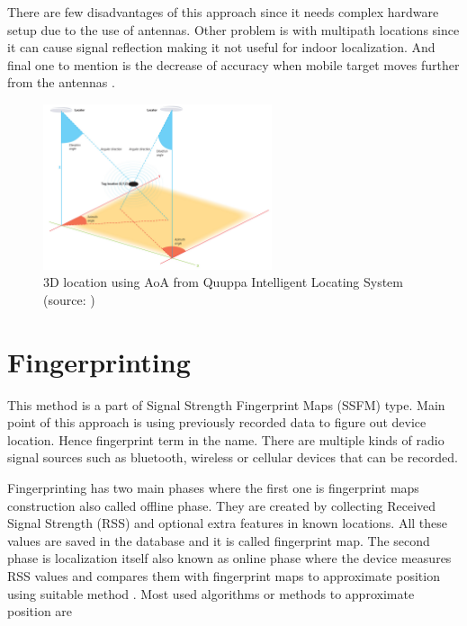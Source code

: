 There are few disadvantages of this approach since it needs complex hardware setup due to the use of antennas. Other problem is with multipath locations since it can cause signal reflection making it not useful for indoor localization. And final one to mention is the decrease of accuracy when mobile target moves further from the antennas \cite{AoA, RofAoA}.

\begin{figure}[h!]
	\begin{centering}
		\includegraphics[width=0.6\textwidth]{img/angulation}
		\par\end{centering}
	\caption{3D location using AoA from Quuppa Intelligent Locating System (source: \cite{QAoA})\label{fig:AoAQuuppa}}
	\label{fig03c02}
\end{figure}

\section{Fingerprinting}\label{sec:Fingerprinting}
This method is a part of Signal Strength Fingerprint Maps (SSFM) type. Main point of this approach is using previously recorded data to figure out device location. Hence fingerprint term in the name. There are multiple kinds of radio signal sources such as bluetooth, wireless or cellular devices that can be recorded.

Fingerprinting has two main phases where the first one is fingerprint maps construction also called offline phase. They are created by collecting Received Signal Strength (RSS) and optional extra features in known locations. All these values are saved in the database and it is called fingerprint map. The second phase is localization itself also known as online phase where the device measures RSS values and compares them with fingerprint maps to approximate position using suitable method \cite{LocalizationApproaches, ILWTP}. Most used algorithms or methods to approximate position are \cite{IILUBLEB}

